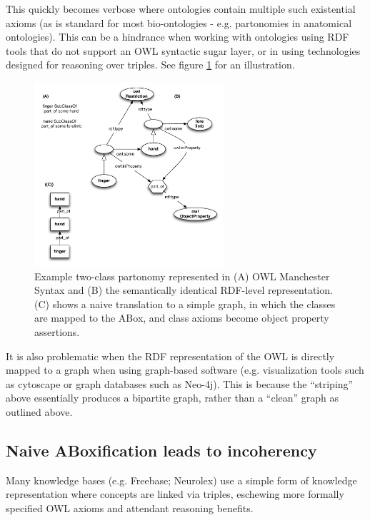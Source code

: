 \documentclass{my}
\begin{document}
This quickly becomes verbose where ontologies contain multiple such
existential axioms (as is standard for most bio-ontologies -
e.g. partonomies in anatomical ontologies). This can be a hindrance
when working with ontologies using RDF tools that do not support an
OWL syntactic sugar layer, or in using technologies designed for
reasoning over triples. See figure \ref{fig:partonomy} for an
illustration.

\begin{figure}
\center
\includegraphics[width=7cm]{partonomy}
\caption{Example two-class partonomy represented in (A) OWL Manchester
  Syntax and (B) the semantically identical RDF-level
  representation. (C) shows a naive translation to a simple graph, in
  which the classes are mapped to the ABox, and class axioms become
  object property assertions.}
\label{fig:partonomy}
\end{figure}


It is also problematic when the RDF representation of the OWL is
directly mapped to a graph when using graph-based software
(e.g. visualization tools such as cytoscape or graph databases such as
Neo-4j). This is because the ``striping'' above essentially produces a
bipartite graph, rather than a ``clean'' graph as outlined above.


\subsection{Naive ABoxification leads to incoherency}

Many knowledge bases (e.g. Freebase; Neurolex) use a simple form of
knowledge representation where concepts are linked via triples,
eschewing more formally specified OWL axioms and attendant reasoning
benefits.
\end{document}

